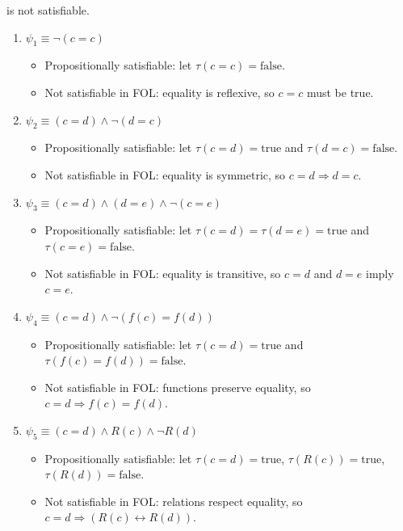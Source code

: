 \documentclass{article}
\begin{document}
is not satisfiable.
\begin{enumerate}
    \item $\psi_1 \equiv \neg(c=c)$

    \begin{itemize}
        \item Propositionally satisfiable: let $\tau(c=c)=\mathrm{false}$.
        \item Not satisfiable in FOL: equality is reflexive, so $c=c$ must be true.
    \end{itemize}

    \item $\psi_2 \equiv (c=d)\wedge \neg(d=c)$

    \begin{itemize}
        \item Propositionally satisfiable: let $\tau(c=d)=\mathrm{true}$ and $\tau(d=c)=\mathrm{false}$.
        \item Not satisfiable in FOL: equality is symmetric, so $c=d \Rightarrow d=c$.
    \end{itemize}

    \item $\psi_3 \equiv (c=d)\wedge (d=e)\wedge \neg(c=e)$

    \begin{itemize}
        \item Propositionally satisfiable: let $\tau(c=d)=\tau(d=e)=\mathrm{true}$ and $\tau(c=e)=\mathrm{false}$.
        \item Not satisfiable in FOL: equality is transitive, so $c=d$ and $d=e$ imply $c=e$.
    \end{itemize}

    \item $\psi_4 \equiv (c=d)\wedge \neg(f(c)=f(d))$

    \begin{itemize}
        \item Propositionally satisfiable: let $\tau(c=d)=\mathrm{true}$ and $\tau(f(c)=f(d))=\mathrm{false}$.
        \item Not satisfiable in FOL: functions preserve equality, so $c=d \Rightarrow f(c)=f(d)$.
    \end{itemize}

    \item $\psi_5 \equiv (c=d)\wedge R(c)\wedge \neg R(d)$

    \begin{itemize}
        \item Propositionally satisfiable: let $\tau(c=d)=\mathrm{true}$, $\tau(R(c))=\mathrm{true}$, $\tau(R(d))=\mathrm{false}$.
        \item Not satisfiable in FOL: relations respect equality, so $c=d \Rightarrow (R(c)\leftrightarrow R(d))$.
    \end{itemize}
\end{enumerate}
\bigskip
\end{document}
